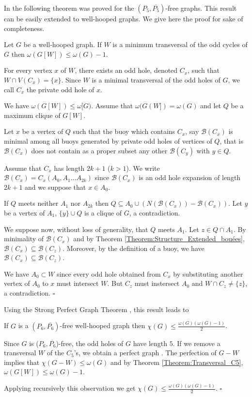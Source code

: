 \documentclass{amsart}
\theoremstyle{definition}
\theoremstyle{remark}
\newenvironment{prf}{{\bf \noindent Proof. } }{\hfill$\square$\\}
\newcommand{\wh}{well-hooped\xspace}
\newcommand{\extB}{buoy\xspace}
\newcommand{\extBs}{buoys\xspace}
\begin{document}
In \cite{FouGiaMaiThu1995} the following theorem was proved for the $(P_{5},\overline{P_{5}})$-free graphs. This result can be easily extended to \wh graphs. We give here the proof for sake of completeness.
\begin{thm}\label{Theorem:Transversal_C5} Let $G$ be a \wh graph. If $W$ is a minimum transversal of the odd cycles of $G$ then $\omega(G[W]) \leq \omega(G)-1$.
\end{thm}
\begin{prf}
 For every vertex $x$ of $W$, there exists an odd hole, denoted $C_x$, such that $W\cap V(C_x)=\{x\}$. Since $W$ is a minimal transversal of the odd holes of $G$, we call $C_x$ the private odd hole of $x$.

We have $\omega(G[W])\leq \omega[G)$. Assume that $\omega(G(W])=\omega(G)$ and let $Q$ be a maximum clique of $G[W]$.

Let $x$ be a vertex of $Q$ such that the \extB which contains $C_x$, say $\mathcal{B}(C_x)$ is minimal among all \extBs generated by private odd holes of vertices of $Q$, that is $\mathcal{B}(C_x)$ 
does not contain as a proper subset
any other $\mathcal{B}(C_y)$ with $y\in Q$.

Assume that $C_x$ has length $2k+1$ ($k>1$). We write $\mathcal{B}(C_x)=C_x(A_0,A_1\ldots A_{2k})$ since $\mathcal{B}(C_x)$ is an odd hole expansion of length $2k+1$ and we suppose that $x\in A_0$.

If $Q$ meets neither $A_1$ nor $A_{2k}$ then $Q\subseteq A_0\cup (N(\mathcal{B}(C_x))-\mathcal{B}(C_x))$. Let $y$ be a vertex of $A_1$, $\{y\}\cup Q$ is a clique of $G$, a contradiction.

We suppose now, without loss of generality, that $Q$ meets $A_1$. Let $z\in Q\cap A_1$. By minimality of $\mathcal{B}(C_x)$  and by Theorem \ref{Theorem:Structure_Extended_bouées}, $\mathcal{B}(C_x)\subseteq \mathcal{B}(C_z)$. 
Moreover, by the definition of 
a \extB, we have $\mathcal{B}(C_x)\subseteq \mathcal{B}(C_z)$.

We have $A_0\subset W$ since every odd hole obtained from $C_x$ by substituting another vertex of $A_0$ to $x$ must intersect $W$. But $C_z$ must instersect $A_0$ and $W\cap C_z\neq\{z\}$, a contradiction.
\end{prf}


Using the Strong Perfect Graph Theorem \cite{ChuRobSeyTho2006}, this result leads to

 \begin{thm} \label{Theorem:Gfree_ChiBound}
If $G$ is a $(P_6,\overline{P_6})$-free \wh graph then $\chi(G) \leq \frac{\omega(G)(\omega(G)-1)}{2}$.
 \end{thm}
\begin{prf}
Since $G$ is ($P_6,\overline{P_6}$)-free, the odd holes of $G$ have length $5$. If we remove a transversal $W$ of the $C_5$'s, we obtain a perfect graph . The perfection of $G-W$ implies that $\chi(G-W)\leq \omega(G)$ 
and by Theorem \ref{Theorem:Transversal_C5}, $\omega(G[W])\leq \omega(G)-1$.

Applying recursively this observation we get $\chi(G) \leq \frac{\omega(G)(\omega(G)-1)}{2}$.
\end{prf}
\end{document}
